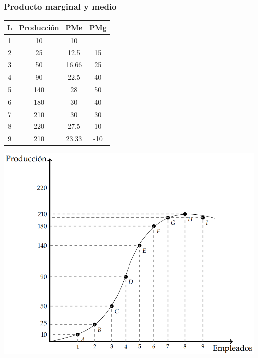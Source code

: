 \documentclass{beamer}
\begin{document}
\begin{frame}
    \frametitle{Producto marginal y medio}
    \begin{table}[h]
        \centering
        \begin{minipage}{0.45\textwidth}
        \renewcommand{\arraystretch}{1.3}
        \small
        \begin{tabular}{cccc}
            \hline
            \textbf{L} & \textbf{Producción} & \textbf{PMe} & \textbf{PMg} \\
            \hline
            1 & 10  & 10    &    \\
            2 & 25  & 12.5  & 15 \\
            3 & 50  & 16.66 & 25 \\
            4 & 90  & 22.5  & 40 \\
            5 & 140 & 28    & 50 \\
            6 & 180 & 30    & 40 \\
            7 & 210 & 30    & 30 \\
            8 & 220 & 27.5  & 10 \\
            9 & 210 & 23.33 & -10 \\
            \hline
        \end{tabular}
        \end{minipage}
        \begin{minipage}{0.45\textwidth}
            \centering
            \vspace{11mm}
            \includegraphics[scale=0.3]{../Figures/C12.1.png} 
        \end{minipage}
    \end{table}
    \end{frame}
\end{document}
